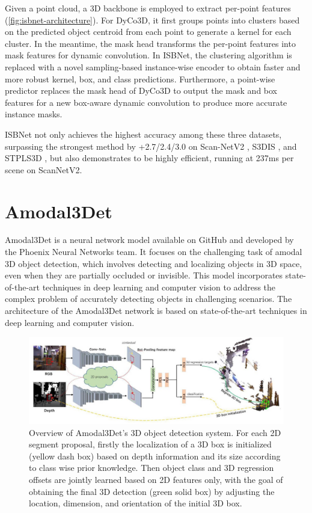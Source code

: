 Given a point cloud, a 3D backbone is employed to extract per-point features (\cref{fig:isbnet-architecture}). For DyCo3D, it first groups points into clusters based on the predicted object centroid from each point to generate a kernel for each cluster. In the meantime, the mask head transforms the per-point features into mask features for dynamic convolution. In ISBNet, the clustering algorithm is replaced with a novel sampling-based instance-wise encoder to obtain faster and more robust kernel, box, and class predictions. Furthermore, a point-wise predictor replaces the mask head of DyCo3D to output the mask and box features for a new box-aware dynamic convolution to produce more accurate instance masks.

ISBNet not only achieves the highest accuracy among these three datasets, surpassing the strongest method by +2.7/2.4/3.0 on Scan-NetV2 \cite{dai2017scannet}, S3DIS \cite{armeni2017joint}, and STPLS3D \cite{Chen_2022_BMVC}, but also demonstrates to be highly efficient, running at 237ms per scene on ScanNetV2.



\section{Amodal3Det}
Amodal3Det \cite{zhuo17amodal3det} is a neural network model available on GitHub and developed by the Phoenix Neural Networks team. It focuses on the challenging task of amodal 3D object detection, which involves detecting and localizing objects in 3D space, even when they are partially occluded or invisible. This model incorporates state-of-the-art techniques in deep learning and computer vision to address the complex problem of accurately detecting objects in challenging scenarios. The architecture of the Amodal3Det network is based on state-of-the-art techniques in deep learning and computer vision. 

\begin{figure}[ht]
    \centering
    \includegraphics[width=1.0\textwidth]{img/amodal3det.jpg}
    \caption{Overview of Amodal3Det's 3D object detection system. For each 2D segment proposal, firstly the localization of a 3D box is initialized (yellow dash box) based on depth information and its size according to class wise prior knowledge. Then object class and 3D regression offsets are jointly learned based on 2D features only, with the goal of obtaining the final 3D detection (green solid box) by adjusting the location, dimension, and orientation of the initial 3D box.}
    \label{fig:amodal-arch}
\end{figure}


